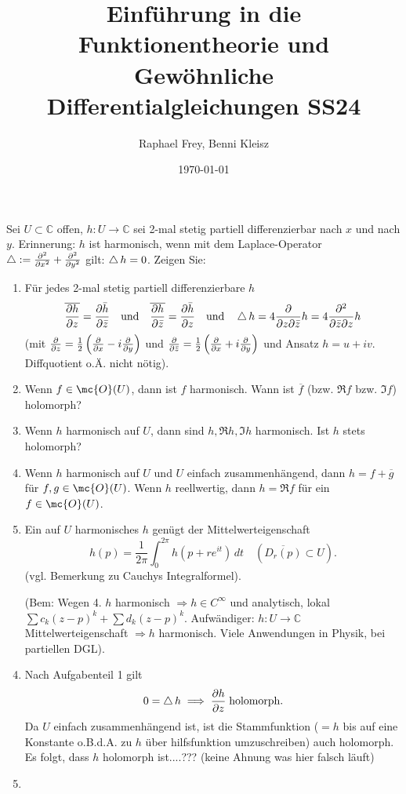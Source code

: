 \documentclass[ngerman]{report}
\title{Einführung in die Funktionentheorie und Gewöhnliche Differentialgleichungen SS24}
\author{Raphael Frey, Benni Kleisz}
\institute{Universität Tübingen}
\date{\today}
\begin{document}
\setcounter{question}{1}
\setcounter{answer}{1}
\begin{question}
    Sei $U \subset \mathbb{C}$ offen, $h : U \to \mathbb{C}$ sei 2-mal stetig partiell differenzierbar nach $x$ und nach $y$. Erinnerung: $h$ ist harmonisch, wenn mit dem Laplace-Operator $\laplace := \pdv[2]{x} + \pdv[2]{y}$ gilt: $\laplace h = 0$. Zeigen Sie:
\begin{enumerate}
    \item Für jedes 2-mal stetig partiell differenzierbare $h$
    \begin{align*}
        \overline{\pdv{h}{z}} = \pdv{\bar{h}}{\bar{z}} \quad \text{und} \quad \overline{\pdv{h}{\bar{z}}} = \pdv{\bar{h}}{z} \quad \text{und}\quad \laplace h = 4 \pdv{z \partial \bar{z}} h = 4 \frac{\partial^2}{\partial \bar{z} \partial z} h
    \end{align*}
    (mit $ \pdv{z} = \frac{1}{2} \left( \pdv{x} - i \pdv{y} \right) $ und $ \pdv{\bar{z}} = \frac{1}{2} \left( \pdv{x} + i \pdv{y} \right) $ und Ansatz $ h = u + iv $. Diffquotient o.Ä. nicht nötig).
    
    \item Wenn $ f \in \mc{O}(U) $, dann ist $ f $ harmonisch. Wann ist $ \overline{f} $ (bzw. $ \Re f $ bzw. $ \Im f $) holomorph?
    \item Wenn $ h $ harmonisch auf $ U $, dann sind $ h, \Re h, \Im h $ harmonisch. Ist $ h $ stets holomorph?
    \item Wenn $ h $ harmonisch auf $ U $ und $ U $ einfach zusammenhängend, dann $ h = f + \overline{g} $ für $ f, g \in \mc{O}(U) $. Wenn $ h $ reellwertig, dann $ h = \Re f $ für ein $ f \in \mc{O}(U) $.
    \item Ein auf $ U $ harmonisches $ h $ genügt der Mittelwerteigenschaft
    \[
    h(p) = \frac{1}{2\pi} \int_0^{2\pi} h(p + re^{it}) \, dt \quad (\overline{D_r(p)} \subset U).
    \]
    (vgl. Bemerkung zu Cauchys Integralformel).
    
    (Bem: Wegen 4. $ h $ harmonisch $\Rightarrow h \in C^\infty $ und analytisch, lokal $ \sum c_k (z - p)^k + \sum d_k (z - p)^k $. Aufwändiger: $ h : U \to \mathbb{C} $ Mittelwerteigenschaft $\Rightarrow h $ harmonisch. Viele Anwendungen in Physik, bei partiellen DGL).
\end{enumerate}
\end{question}
\begin{answer}
    \begin{enumerate}
        \setcounter{enumi}{3}
        \item Nach Aufgabenteil 1 gilt
        \begin{align*}
            0 = \laplace h \implies \pder[h]{z} \;\text{holomorph}.
        \end{align*}
        Da $U$ einfach zusammenhängend ist, ist die Stammfunktion ($=h$ bis auf eine Konstante o.B.d.A. zu $h$ über hilfsfunktion umzuschreiben) auch holomorph. Es folgt, dass $h$ holomorph ist....??? (keine Ahnung was hier falsch läuft)
        \item 
    \end{enumerate}
\end{answer}
\end{document}
